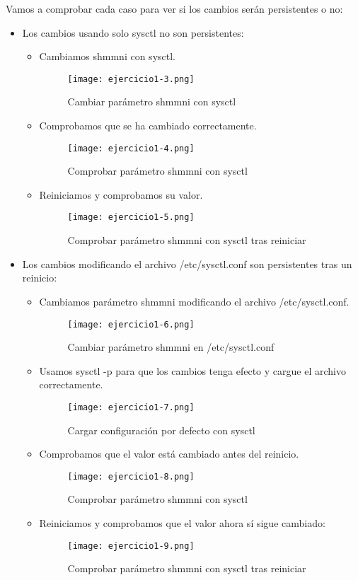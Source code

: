	Vamos a comprobar cada caso para ver si los cambios serán persistentes o no:
	\begin{itemize}
		\item Los cambios usando solo sysctl no son persistentes:
			\begin{itemize}
				\item Cambiamos shmmni con sysctl.
					\begin{figure}[H] 
						\centering
						\texttt{[image: ejercicio1-3.png]} 
						\label{figura3} 
						\caption{Cambiar parámetro shmmni con sysctl}
					\end{figure}
				\item Comprobamos que se ha cambiado correctamente.
					\begin{figure}[H] 
						\centering
						\texttt{[image: ejercicio1-4.png]} 
						\label{figura4} 
						\caption{Comprobar parámetro shmmni con sysctl}
					\end{figure}
				\item Reiniciamos y comprobamos su valor.
					\begin{figure}[H] 
						\centering
						\texttt{[image: ejercicio1-5.png]} 
						\label{figura5} 
						\caption{Comprobar parámetro shmmni con sysctl tras reiniciar}
					\end{figure}
			\end{itemize}
		\item Los cambios modificando el archivo /etc/sysctl.conf son persistentes tras un reinicio:
			\begin{itemize}
				\item Cambiamos parámetro shmmni modificando el archivo /etc/sysctl.conf.
					\begin{figure}[H] 
						\centering
						\texttt{[image: ejercicio1-6.png]} 
						\label{figura6} 
						\caption{Cambiar parámetro shmmni en /etc/sysctl.conf}
					\end{figure}
				\item Usamos sysctl -p para que los cambios tenga efecto y cargue el archivo correctamente.
					\begin{figure}[H] 
						\centering
						\texttt{[image: ejercicio1-7.png]} 
						\label{figura7} 
						\caption{Cargar configuración por defecto con sysctl}
					\end{figure}
				\item Comprobamos que el valor está cambiado antes del reinicio.
					\begin{figure}[H] 
						\centering
						\texttt{[image: ejercicio1-8.png]} 
						\label{figura8} 
						\caption{Comprobar parámetro shmmni con sysctl}
					\end{figure}
				\item Reiniciamos y comprobamos que el valor ahora sí sigue cambiado:
					\begin{figure}[H] 
						\centering
						\texttt{[image: ejercicio1-9.png]} 
						\label{figura9} 
						\caption{Comprobar parámetro shmmni con sysctl tras reiniciar}
					\end{figure}
			\end{itemize}
	\end{itemize}
	
